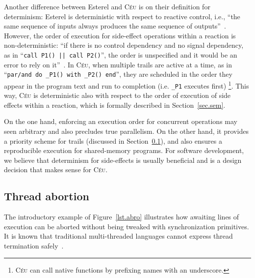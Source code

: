\documentclass{acm_proc_article-sp}
\newcommand{\CEU}{\textsc{C\'{e}u}\xspace}
\newcommand{\code}[1] {{\small{\texttt{#1}}}}
\newcommand{\1}{\;}
\newcommand{\2}{\;\;}
\newcommand{\3}{\;\;\;}
\newcommand{\5}{\;\;\;\;\;}
\begin{document}
Another difference between Esterel and \CEU is on their definition for 
determinism:
%
Esterel is deterministic with respect to reactive control, i.e., ``the same 
sequence of inputs always produces the same sequence of 
outputs''~\cite{esterel.primer}.
However, the order of execution for side-effect operations within a reaction is 
non-deterministic: ``if there is no control dependency and no signal 
dependency, as in ``\code{call P1() || call P2()}'', the order is unspecified 
and it would be an error to rely on it''~\cite{esterel.primer}.
%
In \CEU, when multiple trails are active at a time, as in
``\code{par/and~do~\_P1()~with~\_P2()~end}'', they are scheduled in the order 
they appear in the program text and run to completion (i.e. \code{\_P1} 
executes first)%
\footnote{
\CEU can call native functions by prefixing names with an underscore.
}.
%
This way, \CEU is deterministic also with respect to the order of execution of 
side effects within a reaction, which is formally described in 
Section~\ref{sec.sem}.

On the one hand, enforcing an execution order for concurrent operations may 
seen arbitrary and also precludes true parallelism.
On the other hand, it provides a priority scheme for trails (discussed in 
Section~\ref{sec.ceu.abortion}), and also ensures a reproducible execution for 
shared-memory programs.
%
For software development, we believe that determinism for side-effects is 
usually beneficial and is a design decision that makes sense for \CEU.

\begin{comment}
For instance, in Esterel, ``if a variable is written by some thread, then it 
can neither be read nor be written by concurrent 
threads''~\cite{esterel.primer}.

However, in Esterel, \emph{if a variable is written by some thread, then it can 
neither be read nor be written by concurrent threads}~\cite{esterel.primer} 
\end{comment}

\subsection{Thread abortion}
\label{sec.ceu.abortion}

The introductory example of Figure~\ref{lst.abro} illustrates how awaiting 
lines of execution can be aborted without being tweaked with synchronization 
primitives.
It is known that traditional multi-threaded languages cannot express thread 
termination safely~\cite{esterel.preemption,sync_async.threadsstop}.
\end{document}

